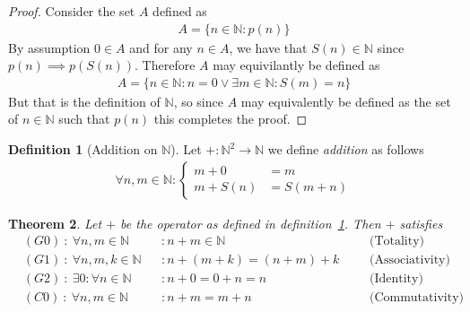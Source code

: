 \documentclass[a4paper,11pt]{article}
\theoremstyle{plain}
\newtheorem{theorem}{Theorem}
\theoremstyle{definition}
\newtheorem{definition}[theorem]{Definition}
\newcommand{\N}{\mathbb{N}}
\begin{document}
\begin{proof}
	Consider the set $A$ defined as
	\begin{align*}
		A=\{n\in\N:p(n)\}
	\end{align*}
	By assumption $0\in A$ and for any $n\in A$, we have that $S(n)\in\N$ since
	\newline$p(n)\implies p(S(n))$. Therefore $A$ may equivilantly be defined as
	\begin{align*}
		A=\{n\in\N:n=0\lor\exists m\in\N:S(m)=n\}
	\end{align*}
	But that is the definition of $\N$, so since $A$ may equivalently be defined
	as the set of $n\in\N$ such that $p(n)$ this completes the proof.
\end{proof}
\begin{definition}[Addition on $\N$]\label{addition}
	Let $+:\N^2\rightarrow\N$ we define \textit{addition} as
	follows
	\begin{align*}
	\forall n,m\in\N:
	\begin{cases}
		m+0 & = m \\
		m+S(n) &= S(m+n)
	\end{cases}
	\end{align*}
\end{definition}
\begin{theorem}
	Let $+$ be the operator as defined in definition~\ref{addition}. Then $+$
	satisfies
	\begin{align*}
		&(G0)\ :\ \forall n,m\in\N &&:n+m\in\N 
		&&&\text{(Totality)}\\
		&(G1)\ :\ \forall n,m,k\in\N&&:n+(m+k)=(n+m)+k
		&&&\text{(Associativity)}\\
		&(G2)\ :\ \exists 0:\forall n\in\N &&: n+0=0+n=n 
		&&&\text{(Identity)}\\
		&(C0)\ :\ \forall n,m\in\N &&: n+m=m+n
		&&&\text{(Commutativity)}\\
	\end{align*}
\end{theorem}
\end{document}
